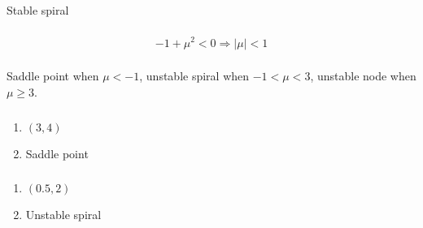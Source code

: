 \documentclass{article}
\begin{document}
\setcounter{subsubsection}{14}
\subsubsection{}

Stable spiral

\setcounter{subsubsection}{16}
\subsubsection{}

\[-1 + \mu^2 < 0 \Rightarrow |\mu| < 1\]

\setcounter{subsubsection}{18}
\subsubsection{}

Saddle point when $\mu < -1$, unstable spiral when $-1 < \mu < 3$, unstable node when $\mu \ge 3$.

\setcounter{subsubsection}{22}
\subsubsection{}

\begin{enumerate}
  \item $(3, 4)$

  \item Saddle point
\end{enumerate}

\setcounter{subsubsection}{24}
\subsubsection{}

\begin{enumerate}
  \item $(0.5, 2)$

  \item Unstable spiral
\end{enumerate}
\end{document}
